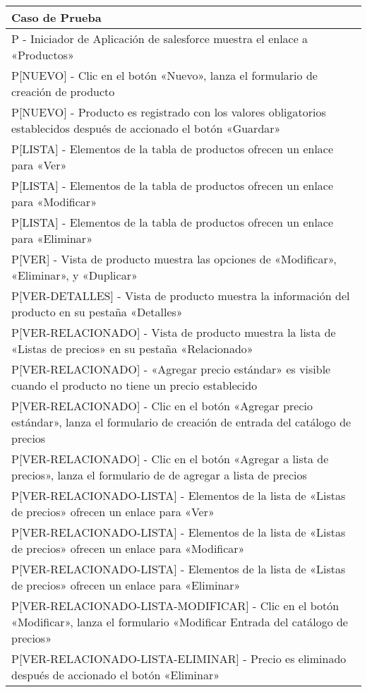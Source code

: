 \begin{longtable}{|p{15.0cm}|}
\hline
\textbf{Caso de Prueba} \\
\hline
P - Iniciador de Aplicación de salesforce muestra el enlace a «Productos» \\ \hline
P[NUEVO] - Clic en el botón «Nuevo», lanza el formulario de creación de producto \\ \hline
P[NUEVO] - Producto es registrado con los valores obligatorios establecidos después de accionado el botón «Guardar» \\ \hline
P[LISTA] - 		Elementos de la tabla de productos ofrecen un enlace para «Ver» \\ \hline
P[LISTA] - 		Elementos de la tabla de productos ofrecen un enlace para «Modificar» \\ \hline
P[LISTA] - 		Elementos de la tabla de productos ofrecen un enlace para «Eliminar» \\ \hline
P[VER] - 		Vista de producto muestra las opciones de «Modificar», «Eliminar», y «Duplicar» \\ \hline
P[VER-DETALLES] - 		Vista de producto muestra la información del producto en su pestaña «Detalles» \\ \hline
P[VER-RELACIONADO] - 		Vista de producto muestra la lista de «Listas de precios» en su pestaña «Relacionado» \\ \hline
P[VER-RELACIONADO] - 		«Agregar precio estándar» es visible cuando el producto no tiene un precio establecido \\ \hline
P[VER-RELACIONADO] - 		Clic en el botón «Agregar precio estándar», lanza el formulario de creación de entrada del catálogo de precios \\ \hline
P[VER-RELACIONADO] - 		Clic en el botón «Agregar a lista de precios», lanza el formulario de de agregar a lista de precios \\ \hline
P[VER-RELACIONADO-LISTA] - 		Elementos de la lista de «Listas de precios» ofrecen un enlace para «Ver» \\ \hline
P[VER-RELACIONADO-LISTA] - 		Elementos de la lista de «Listas de precios» ofrecen un enlace para «Modificar» \\ \hline
P[VER-RELACIONADO-LISTA] - 		Elementos de la lista de «Listas de precios» ofrecen un enlace para «Eliminar» \\ \hline
P[VER-RELACIONADO-LISTA-MODIFICAR] - 		Clic en el botón «Modificar», lanza el formulario «Modificar Entrada del catálogo de precios» \\ \hline
P[VER-RELACIONADO-LISTA-ELIMINAR] - 		Precio es eliminado después de accionado el botón «Eliminar» \\ \hline

\end{longtable}
